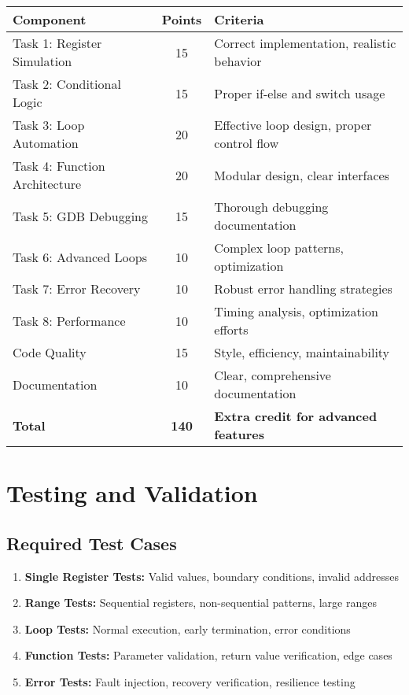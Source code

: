 \documentclass[11pt,a4paper]{article}
\begin{document}
\begin{center}
\begin{tabular}{|l|c|l|}
\hline
\textbf{Component} & \textbf{Points} & \textbf{Criteria} \\
\hline
Task 1: Register Simulation & 15 & Correct implementation, realistic behavior \\
Task 2: Conditional Logic & 15 & Proper if-else and switch usage \\
Task 3: Loop Automation & 20 & Effective loop design, proper control flow \\
Task 4: Function Architecture & 20 & Modular design, clear interfaces \\
Task 5: GDB Debugging & 15 & Thorough debugging documentation \\
Task 6: Advanced Loops & 10 & Complex loop patterns, optimization \\
Task 7: Error Recovery & 10 & Robust error handling strategies \\
Task 8: Performance & 10 & Timing analysis, optimization efforts \\
Code Quality & 15 & Style, efficiency, maintainability \\
Documentation & 10 & Clear, comprehensive documentation \\
\hline
\textbf{Total} & \textbf{140} & \textbf{Extra credit for advanced features} \\
\hline
\end{tabular}
\end{center}

\section{Testing and Validation}

\subsection{Required Test Cases}
\begin{enumerate}
    \item \textbf{Single Register Tests:} Valid values, boundary conditions, invalid addresses
    \item \textbf{Range Tests:} Sequential registers, non-sequential patterns, large ranges
    \item \textbf{Loop Tests:} Normal execution, early termination, error conditions
    \item \textbf{Function Tests:} Parameter validation, return value verification, edge cases
    \item \textbf{Error Tests:} Fault injection, recovery verification, resilience testing
\end{enumerate}
\end{document}
